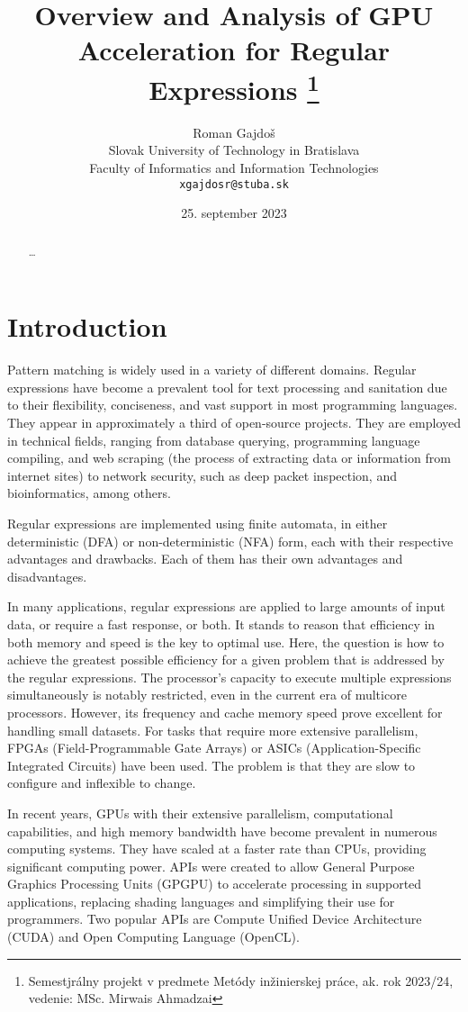 \documentclass[10pt,onecolumn,twoside,english,a4paper]{article}
\title{Overview and Analysis of GPU Acceleration for Regular Expressions
\thanks{Semestjrálny projekt v predmete Metódy inžinierskej práce, ak. rok 2023/24, vedenie: MSc. Mirwais Ahmadzai}} %
\author{Roman Gajdoš\\[2pt]
	{\small Slovak University of Technology in Bratislava}\\
	{\small Faculty of Informatics and Information Technologies}\\
	{\small \texttt{xgajdosr@stuba.sk}}
	}
\date{\small 25. september 2023} %
\begin{document}
\maketitle

\begin{abstract}
	\ldots
\end{abstract}



\section{Introduction}

Pattern matching is widely used in a variety of different domains. Regular expressions have become a prevalent tool for text processing and sanitation due to their flexibility, conciseness, and vast support in most programming languages. They appear in approximately a third of open-source projects. They are employed in technical fields, ranging from database querying, programming language compiling, and web scraping (the process of extracting data or information from internet sites) to network security, such as deep packet inspection, and bioinformatics, among others.

Regular expressions are implemented using finite automata, in either deterministic (DFA) or non-deterministic (NFA) form, each with their respective advantages and drawbacks. Each of them has their own advantages and disadvantages.

In many applications, regular expressions are applied to large amounts of input data, or require a fast response, or both. It stands to reason that efficiency in both memory and speed is the key to optimal use.
Here, the question is how to achieve the greatest possible efficiency for a given problem that is addressed by the regular expressions.
The processor’s capacity to execute multiple expressions simultaneously is notably restricted, even in the current era of multicore processors. However, its frequency and cache memory speed prove excellent for handling small datasets. For tasks that require more extensive parallelism, FPGAs (Field-Programmable Gate Arrays) or ASICs (Application-Specific Integrated Circuits) have been used. The problem is that they are slow to configure and inflexible to change.

In recent years, GPUs with their extensive parallelism, computational capabilities, and high memory bandwidth have become prevalent in numerous computing systems. They have scaled at a faster rate than CPUs, providing significant computing power. APIs were created to allow General Purpose Graphics Processing Units (GPGPU) to accelerate processing in supported applications, replacing shading languages and simplifying their use for programmers. Two popular APIs are Compute Unified Device Architecture (CUDA) and Open Computing Language (OpenCL).
\end{document}
